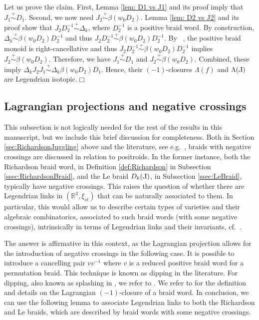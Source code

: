 \documentclass[10pt]{amsart}
\theoremstyle{plain}
\theoremstyle{definition}
\theoremstyle{remark}
\numberwithin{equation}{section}
\newcommand{\R}{\mathbb{R}}
\def\Le{\reflectbox{$\mathrm{L}$}}
\begin{document}
Let us prove the claim. First, Lemma \ref{lem: D1 vs J1}  and its proof imply that $J_1\stackrel{+}{\sim}D_1$. Second, we now need $J_2\stackrel{+}{\sim}\beta(w_0D_2)$. Lemma \ref{lem: D2 vs J2} and its proof show that $J_2D_2^{-1}\stackrel{+}{\sim}\Delta_k$, where $D_2^{-1}$ is a positive braid word. By construction, $\Delta_k\stackrel{+}{\sim}\beta(w_0D_2)D_2^{-1}$ and thus $J_2D_2^{-1}\stackrel{+}{\sim}\beta(w_0D_2)D_2^{-1}$. By ~\cite[Prop.~II.4.7]{Dehornoy00}, the positive braid monoid is right-cancellative and thus $J_2D_2^{-1}\stackrel{+}{\sim}\beta(w_0D_2)D_2^{-1}$ implies $J_2\stackrel{+}{\sim}\beta(w_0D_2)$. Therefore, we have $J_1\stackrel{+}{\sim}D_1$ and $J_2\stackrel{+}{\sim}\beta(w_0D_2)$. Combined, these imply $\Delta_kJ_2J_1\stackrel{+}{\sim}\Delta_k\beta(w_0D_2)D_1$. Hence, their $(-1)$-closures $\Lambda(f)$ and $\Lambda(\Le)$ are Legendrian isotopic.\hfill$\Box$

\subsection{Lagrangian projections and negative crossings}\label{ssec:Lag_negative} This subsection is not logically needed for the rest of the results in this manuscript, but we include this brief discussion for completeness. Both in Section \ref{sec:RichardsonJuggling} above and the literature, see e.g.~\cite[Section 3]{GL}, braids with negative crossings are discussed in relation to positroids. In the former instance, both the Richardson braid word, in Definition \ref{def:Richardson} in Subsection \ref{ssec:RichardsonBraid}, and the Le braid $D_k(\Le)$, in Subsection \ref{ssec:LeBraid}, typically have negative crossings. This raises the question of whether there are Legendrian links in $(\R^{3},\xi_{st})$ that can be naturally associated to them. In particular, this would allow us to describe certain types of varieties and their algebraic combinatorics, associated to such braid words (with some negative crossings), intrinsically in terms of Legendrian links and their invariants, cf.~\cite{CGGS,CasalsNg}.

\noindent The answer is affirmative in this context, as the Lagrangian projection allows for the introduction of negative crossings in the following case. It is possible to introduce a cancelling pair $vv^{-1}$ where $v$ is a reduced positive braid word for a permutation braid. This technique is known as dipping in the literature. For dipping, also known as splashing in \cite[Section 3.2]{Dip1}, we refer to \cite[Section 2.4]{Dip2}. We refer to \cite[Section 2.2]{CasalsNg} for the definition and details on the Lagrangian $(-1)$-closure of a braid word.  In conclusion,  we can use the following lemma to associate Legendrian links to both the Richardson and Le braids, which are described by braid words with some negative crossings.
\end{document}
